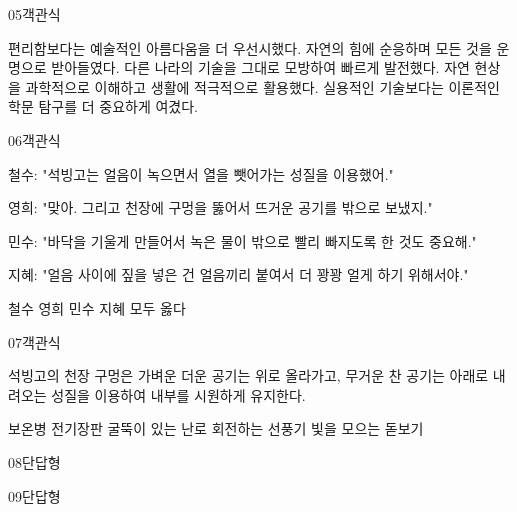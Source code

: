\documentclass[fs9,seriesFre]{korfarm-base}
\begin{document}
\begin{kfQBlock}{05}{객관식}
\begin{kfChoices}
\kfChoice 편리함보다는 예술적인 아름다움을 더 우선시했다.
\kfChoice 자연의 힘에 순응하며 모든 것을 운명으로 받아들였다.
\kfChoice 다른 나라의 기술을 그대로 모방하여 빠르게 발전했다.
\kfChoice 자연 현상을 과학적으로 이해하고 생활에 적극적으로 활용했다.
\kfChoice 실용적인 기술보다는 이론적인 학문 탐구를 더 중요하게 여겼다.
\end{kfChoices}
\end{kfQBlock}
\begin{kfQBlock}{06}{객관식}
\begin{kfEvidence}철수: "석빙고는 얼음이 녹으면서 열을 뺏어가는 성질을 이용했어."

영희: "맞아. 그리고 천장에 구멍을 뚫어서 뜨거운 공기를 밖으로 보냈지."

민수: "바닥을 기울게 만들어서 녹은 물이 밖으로 빨리 빠지도록 한 것도 중요해."

지혜: "얼음 사이에 짚을 넣은 건 얼음끼리 붙여서 더 꽝꽝 얼게 하기 위해서야."\end{kfEvidence}
\begin{kfChoices}
\kfChoice 철수
\kfChoice 영희
\kfChoice 민수
\kfChoice 지혜
\kfChoice 모두 옳다
\end{kfChoices}
\end{kfQBlock}
\begin{kfQBlock}{07}{객관식}
\begin{kfEvidence}석빙고의 천장 구멍은 가벼운 더운 공기는 위로 올라가고, 무거운 찬 공기는 아래로 내려오는 성질을 이용하여 내부를 시원하게 유지한다.\end{kfEvidence}
\begin{kfChoices}
\kfChoice 보온병
\kfChoice 전기장판
\kfChoice 굴뚝이 있는 난로
\kfChoice 회전하는 선풍기
\kfChoice 빛을 모으는 돋보기
\end{kfChoices}
\end{kfQBlock}
\begin{kfQBlock}{08}{단답형}
\end{kfQBlock}
\begin{kfQBlock}{09}{단답형}
\end{kfQBlock}
\end{document}
